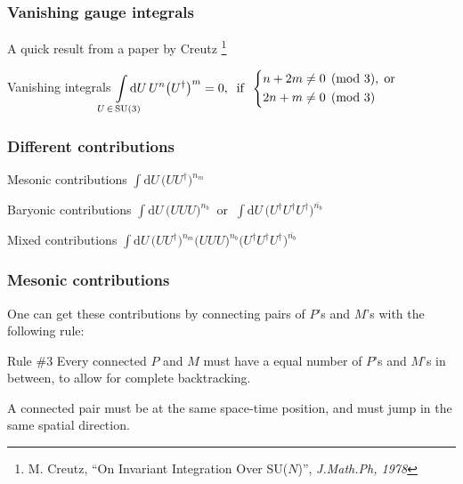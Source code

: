\documentclass[10pt,a4paper,usenames,dvipsnames]{beamer}
\begin{document}
\begin{frame}
  \frametitle{Vanishing gauge integrals}

  A quick result from a paper by Creutz%
  \footnote{M. Creutz, ``On Invariant Integration Over SU($N$)'', \emph{J.Math.Ph, 1978}}

  \begin{alertblock}{Vanishing integrals}
    \centering
    $\displaystyle\int\limits_{\mathclap{U \, \in \, \mathrm{SU}(3)}} \mathrm{d} U \, U^n \big(U^{\dagger}\big)^m = 0, \; \;
    \text{if} \;\; \left\{ \begin{aligned}
      n + 2m &\neq 0 \pmod{3}, \; \text{or} \\
      2n + m &\neq 0 \pmod{3}
    \end{aligned}\right.$
  \end{alertblock}

\end{frame}

\begin{frame}
  \frametitle{Different contributions}

  \begin{block}{Mesonic contributions}
    \centering
    $\displaystyle\int \mathrm{d} U \, \big(U U^{\dagger}\big)^{n_m}$
  \end{block}

  \begin{block}{Baryonic contributions}
    \centering
    $\displaystyle\int \mathrm{d} U \, \big( U U U \big)^{n_b} \; \; \text{or} \; \; \displaystyle\int \mathrm{d} U \, \big(
    U^{\dagger} U^{\dagger} U^{\dagger} \big)^{\bar{n_b}}$
  \end{block}

  \begin{block}{Mixed contributions}
    \centering
    $\displaystyle\int \mathrm{d} U \, \big( U U^{\dagger} \big)^{n_m} \big( U U U \big)^{n_b} \big( U^{\dagger} 
    U^{\dagger} U^{\dagger} \big)^{\bar{n_b}}$
  \end{block}

\end{frame}

\begin{frame}
  \frametitle{Mesonic contributions}

  One can get these contributions by connecting pairs of $P$'s and $M$'s with the following rule:

  \begin{alertblock}{Rule \#3}
    \noindent Every connected $P$ and $M$ must have a equal number of $P$'s and $M$'s in between, to allow for complete backtracking.
  \end{alertblock}

  A connected pair must be at the same space-time position, and must jump in the same spatial direction.

\end{frame}
\end{document}
